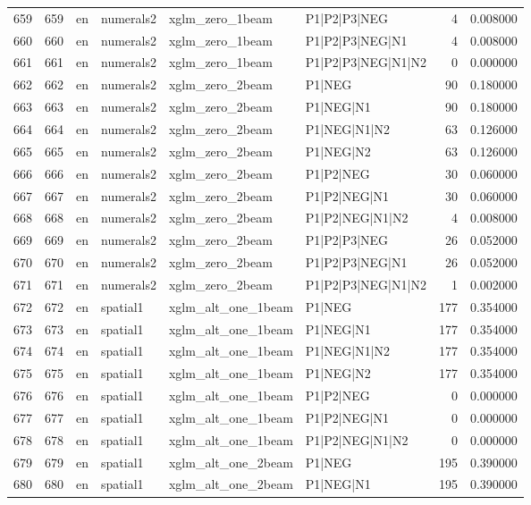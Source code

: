 \begin{tabular}{lrllllrr}
659 & 659 & en & numerals2 & xglm_zero_1beam & P1|P2|P3|NEG & 4 & 0.008000 \\
660 & 660 & en & numerals2 & xglm_zero_1beam & P1|P2|P3|NEG|N1 & 4 & 0.008000 \\
661 & 661 & en & numerals2 & xglm_zero_1beam & P1|P2|P3|NEG|N1|N2 & 0 & 0.000000 \\
662 & 662 & en & numerals2 & xglm_zero_2beam & P1|NEG & 90 & 0.180000 \\
663 & 663 & en & numerals2 & xglm_zero_2beam & P1|NEG|N1 & 90 & 0.180000 \\
664 & 664 & en & numerals2 & xglm_zero_2beam & P1|NEG|N1|N2 & 63 & 0.126000 \\
665 & 665 & en & numerals2 & xglm_zero_2beam & P1|NEG|N2 & 63 & 0.126000 \\
666 & 666 & en & numerals2 & xglm_zero_2beam & P1|P2|NEG & 30 & 0.060000 \\
667 & 667 & en & numerals2 & xglm_zero_2beam & P1|P2|NEG|N1 & 30 & 0.060000 \\
668 & 668 & en & numerals2 & xglm_zero_2beam & P1|P2|NEG|N1|N2 & 4 & 0.008000 \\
669 & 669 & en & numerals2 & xglm_zero_2beam & P1|P2|P3|NEG & 26 & 0.052000 \\
670 & 670 & en & numerals2 & xglm_zero_2beam & P1|P2|P3|NEG|N1 & 26 & 0.052000 \\
671 & 671 & en & numerals2 & xglm_zero_2beam & P1|P2|P3|NEG|N1|N2 & 1 & 0.002000 \\
672 & 672 & en & spatial1 & xglm_alt_one_1beam & P1|NEG & 177 & 0.354000 \\
673 & 673 & en & spatial1 & xglm_alt_one_1beam & P1|NEG|N1 & 177 & 0.354000 \\
674 & 674 & en & spatial1 & xglm_alt_one_1beam & P1|NEG|N1|N2 & 177 & 0.354000 \\
675 & 675 & en & spatial1 & xglm_alt_one_1beam & P1|NEG|N2 & 177 & 0.354000 \\
676 & 676 & en & spatial1 & xglm_alt_one_1beam & P1|P2|NEG & 0 & 0.000000 \\
677 & 677 & en & spatial1 & xglm_alt_one_1beam & P1|P2|NEG|N1 & 0 & 0.000000 \\
678 & 678 & en & spatial1 & xglm_alt_one_1beam & P1|P2|NEG|N1|N2 & 0 & 0.000000 \\
679 & 679 & en & spatial1 & xglm_alt_one_2beam & P1|NEG & 195 & 0.390000 \\
680 & 680 & en & spatial1 & xglm_alt_one_2beam & P1|NEG|N1 & 195 & 0.390000 \\

\end{tabular}
